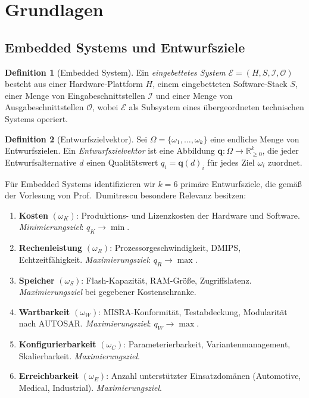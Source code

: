 ﻿\documentclass[a4paper,12pt]{article}
\theoremstyle{definition}
\newtheorem{definition}{Definition}
\begin{document}
\section{Grundlagen}

\subsection{Embedded Systems und Entwurfsziele}

\begin{definition}[Embedded System]
    Ein \emph{eingebettetes System} $\mathcal{E} = (H, S, \mathcal{I}, \mathcal{O})$
    besteht aus einer Hardware-Plattform $H$, einem eingebetteten Software-Stack $S$,
    einer Menge von Eingabeschnittstellen $\mathcal{I}$ und einer Menge von
    Ausgabeschnittstellen $\mathcal{O}$, wobei $\mathcal{E}$ als Subsystem
    eines \"{u}bergeordneten technischen Systems operiert.
\end{definition}

\begin{definition}[Entwurfszielvektor]
    Sei $\Omega = \{\omega_1, \ldots, \omega_k\}$ eine endliche Menge von
    Entwurfszielen. Ein \emph{Entwurfszielvektor} ist eine Abbildung
    $\mathbf{q}: \Omega \to \mathbb{R}_{\geq 0}^k$, die jeder Entwurfsalternative
    $d$ einen Qualit\"{a}tswert $q_i = \mathbf{q}(d)_i$ f\"{u}r jedes Ziel $\omega_i$
    zuordnet.
\end{definition}

F\"{u}r Embedded Systems identifizieren wir $k = 6$ prim\"{a}re Entwurfsziele, die
gem\"{a}{\ss} der Vorlesung von Prof.\ Dumitrescu besondere Relevanz besitzen:

\begin{enumerate}
    \item \textbf{Kosten} $(\omega_K)$: Produktions- und Lizenzkosten der
          Hardware und Software. \emph{Minimierungsziel}: $q_K \to \min$.
    \item \textbf{Rechenleistung} $(\omega_R)$: Prozessorgeschwindigkeit,
          DMIPS, Echtzeit\-f\"{a}higkeit. \emph{Maximierungsziel}: $q_R \to \max$.
    \item \textbf{Speicher} $(\omega_S)$: Flash-Kapazit\"{a}t, RAM-Gr\"{o}{\ss}e,
          Zugriffslatenz. \emph{Maximierungsziel} bei gegebener Kosten\-schranke.
    \item \textbf{Wartbarkeit} $(\omega_W)$: MISRA-Konformit\"{a}t, Testabdeckung,
          Modularit\"{a}t nach AUTOSAR. \emph{Maximierungsziel}: $q_W \to \max$.
    \item \textbf{Konfigurierbarkeit} $(\omega_C)$: Parameterierbarkeit,
          Varianten\-management, Skalierbarkeit. \emph{Maximierungsziel}.
    \item \textbf{Erreichbarkeit} $(\omega_E)$: Anzahl unterst\"{u}tzter
          Einsatzdom\"{a}nen (Automotive, Medical, Industrial). \emph{Maximierungsziel}.
\end{enumerate}
\end{document}
